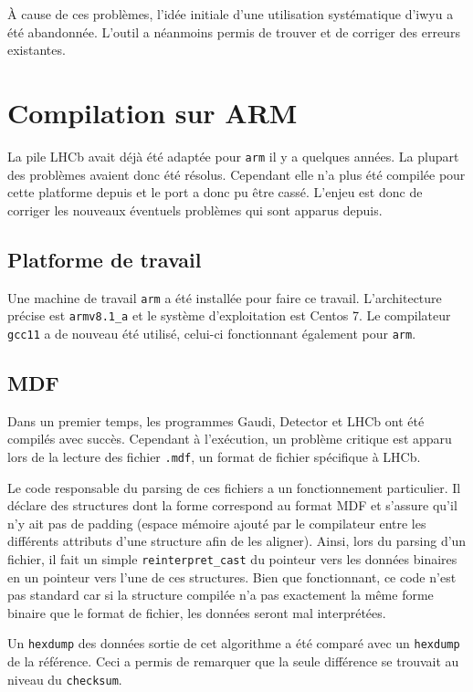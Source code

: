 \documentclass[a4paper,11pt]{report}
\begin{document}
À cause de ces problèmes, l'idée initiale d'une utilisation systématique d'iwyu a été abandonnée.
L'outil a néanmoins permis de trouver et de corriger des erreurs existantes.

\section{Compilation sur ARM}
La pile LHCb avait déjà été adaptée pour \verb'arm' il y a quelques années.
La plupart des problèmes avaient donc été résolus.
Cependant elle n'a plus été compilée pour cette platforme depuis et le port a donc pu être cassé.
L'enjeu est donc de corriger les nouveaux éventuels problèmes qui sont apparus depuis.

\subsection{Platforme de travail}
Une machine de travail \verb'arm' a été installée pour faire ce travail.
L'architecture précise est \verb'armv8.1_a' et le système d'exploitation est Centos 7.
Le compilateur \verb'gcc11' a de nouveau été utilisé, celui-ci fonctionnant également pour \verb'arm'.

\subsection{MDF}
Dans un premier temps, les programmes Gaudi, Detector et LHCb ont été compilés avec succès.
Cependant à l'exécution, un problème critique est apparu lors de la lecture des fichier \verb'.mdf', un format de fichier spécifique à LHCb.

Le code responsable du parsing de ces fichiers a un fonctionnement particulier.
Il déclare des structures dont la forme correspond au format MDF \cite{edms784588} et s'assure qu'il n'y ait pas de padding (espace mémoire ajouté par le compilateur entre les différents attributs d'une structure afin de les aligner).
Ainsi, lors du parsing d'un fichier, il fait un simple \verb'reinterpret_cast' du pointeur vers les données binaires en un pointeur vers l'une de ces structures.
Bien que fonctionnant, ce code n'est pas standard car si la structure compilée n'a pas exactement la même forme binaire que le format de fichier, les données seront mal interprétées.

Un \verb'hexdump' des données sortie de cet algorithme a été comparé avec un \verb'hexdump' de la référence.
Ceci a permis de remarquer que la seule différence se trouvait au niveau du \verb'checksum'.
\end{document}
